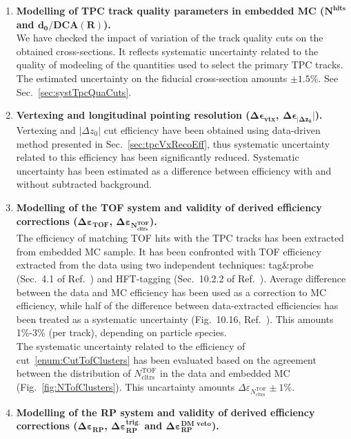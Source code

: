 \begin{enumerate}
 \item \textbf{Modelling of TPC track quality parameters in embedded MC ($\bm{N^{\text{hits}}}$ and $\bm{d_{0}/\text{DCA}(R)}$).}\\
 We have checked the impact of variation of the track quality cuts on the obtained cross-sections. It reflects systematic uncertainty related to the quality of modeeling of the quantities used to select the primary TPC tracks. The estimated uncertainty on the fiducial cross-section amounts $\pm 1.5\%$. See Sec.~\ref{sec:systTpcQuaCuts}.
 \item \textbf{Vertexing and longitudinal pointing resolution ($\bm{\Delta\epsilon_{\text{vtx}}}$, $\bm{\Delta\epsilon_{|\Delta z_{0}}}|$).}\\
 Vertexing and $|\Delta z_{0}|$ cut efficiency have been obtained using data-driven method presented in Sec.~\ref{sec:tpcVxRecoEff}, thus systematic uncertainty related to this efficiency has been significantly reduced. Systematic uncertainty has been estimated as a difference between efficiency with and without subtracted background.
 \item \textbf{Modelling of the TOF system and validity of derived efficiency corrections ($\bm{\Delta\varepsilon_{\text{TOF}}}$, $\bm{\Delta\varepsilon_{N^\text{TOF}_{\text{cltrs}}}}$).}\\
 The efficiency of matching TOF hits with the TPC tracks has been extracted from embedded MC sample. It has been confronted with TOF efficiency extracted from the data using two independent techniques: tag\&probe (Sec.~4.1 of Ref.~\cite{supplementaryNote}) and HFT-tagging (Sec.~10.2.2 of Ref.~\cite{supplementaryNote}). Average difference between the data and MC efficiency has been used as a correction to MC efficiency, while half of the difference between data-extracted efficiencies has been treated as a systematic uncertainty (Fig.~10.16, Ref.~\cite{supplementaryNote}). This amounts 1\%-3\% (per track), depending on particle species.\\
 The systematic uncertainty related to the efficiency of cut~\ref{enum:CutTofClusters} has been evaluated based on the agreement between the distribution of $N^\text{TOF}_{\text{cltrs}}$ in the data and embedded MC (Fig.~\ref{fig:NTofClusters}). This uncartainty amounts $\Delta\varepsilon_{N^\text{TOF}_{\text{cltrs}}}\pm1\%$.
%
 \item \textbf{Modelling of the RP system and validity of derived efficiency corrections ($\bm{\Delta\varepsilon_{\text{RP}}}$, $\bm{\Delta\varepsilon_{\text{RP}}^{\text{trig.}}}$ and $\bm{\Delta\varepsilon_{\text{RP}}^{\text{DM veto}}}$).}\\

\end{enumerate}
